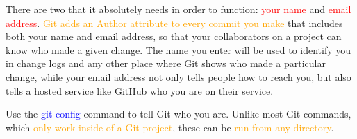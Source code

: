 \documentclass[12pt,a4paper]{article}
\begin{document}
There are two that it absolutely needs in order to function: \textcolor{red}{your name} and \textcolor{red}{email address}. \textcolor{orange}{Git adds an Author attribute to every commit you make} that includes both your name and email address, so that your collaborators on a project can know who made a given change. The name you enter will be used to identify you in change logs and any other place where Git shows who made a particular change, while your email address
not only tells people how to reach you, but also tells a hosted service like GitHub who you are on their service.

Use the \textcolor{blue}{git config} command to tell Git who you are. Unlike most Git commands, which \textcolor{orange}{only work inside of a Git project}, these can be \textcolor{orange}{run from any directory}. 



\end{document}
